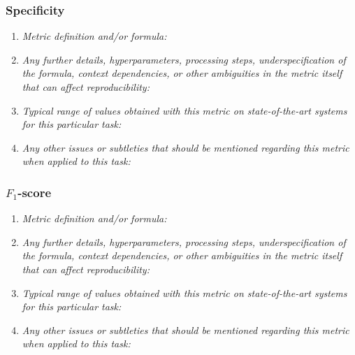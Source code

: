 \documentclass[a4paper,11pt]{article}
\begin{document}
        \subsubsection{Specificity}
            \begin{enumerate}[label=\alph*.]
                \item \textit{Metric definition and/or formula:}
                \bigskip
                \item \textit{Any further details, hyperparameters, processing steps, underspecification of the formula, context dependencies, or other ambiguities in the metric itself that can affect reproducibility:}
                \bigskip
                \item \textit{Typical range of values obtained with this metric on state-of-the-art systems for this particular task:}
                \bigskip
                \item \textit{Any other issues or subtleties that should be mentioned regarding this metric when applied to this task:}
                \bigskip
            \end{enumerate}
        \subsubsection{$F_1$-score}
            \begin{enumerate}[label=\alph*.]
                \item \textit{Metric definition and/or formula:}
                \bigskip
                \item \textit{Any further details, hyperparameters, processing steps, underspecification of the formula, context dependencies, or other ambiguities in the metric itself that can affect reproducibility:}
                \bigskip
                \item \textit{Typical range of values obtained with this metric on state-of-the-art systems for this particular task:}
                \bigskip
                \item \textit{Any other issues or subtleties that should be mentioned regarding this metric when applied to this task:}
                \bigskip
            \end{enumerate}
\end{document}
